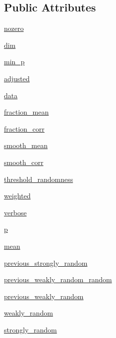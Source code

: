 \subsection*{Public Attributes}
\begin{CompactItemize}
\item 
\hyperlink{classgen_1_1binary_ca500be68fab85fb9606fcb4c5be8f64}{nozero}
\item 
\hyperlink{classgen_1_1binary_37e0504e82a2e1117ed23ff2d8617274}{dim}
\item 
\hyperlink{classgen_1_1binary_ca3be8a3fef7eeebd95bdcd5b5a82a5b}{min\_\-p}
\item 
\hyperlink{classgen_1_1binary_aec6d5ee9de0b2a4ddf0a9fa1ced25ae}{adjusted}
\item 
\hyperlink{classgen_1_1binary_156a3b3004ee18dc4472dbbb22e58441}{data}
\item 
\hyperlink{classgen_1_1binary_d525c9bbdde203e71bfbd20ab8a3b87b}{fraction\_\-mean}
\item 
\hyperlink{classgen_1_1binary_1e3b4573f717d0c9a1c0e04c02f2fd00}{fraction\_\-corr}
\item 
\hyperlink{classgen_1_1binary_37a0b8a17b6838931cc090b0bd420113}{smooth\_\-mean}
\item 
\hyperlink{classgen_1_1binary_6f34a1d5ec2430c38a7d60291e3cf1b5}{smooth\_\-corr}
\item 
\hyperlink{classgen_1_1binary_d6e62d1fa0afe5bd632c632bae0751de}{threshold\_\-randomness}
\item 
\hyperlink{classgen_1_1binary_1249f896120bc73dd69e9cb658847685}{weighted}
\item 
\hyperlink{classgen_1_1binary_273f733629e23ba2e15fad7c1272275d}{verbose}
\item 
\hyperlink{classgen_1_1binary_838502808c65c543b3cb558435047f92}{p}
\item 
\hyperlink{classgen_1_1binary_a14a164be1fc67e5a014782fc29d287b}{mean}
\item 
\hyperlink{classgen_1_1binary_ade0cc2fbad11b31201021a316b6f3a7}{previous\_\-strongly\_\-random}
\item 
\hyperlink{classgen_1_1binary_b84a1de430b3a123d9ccaff9f06d3abc}{previous\_\-weakly\_\-random\_\-random}
\item 
\hyperlink{classgen_1_1binary_8eae76f4e0c1f13ba8ebfed1c5b7fa78}{previous\_\-weakly\_\-random}
\item 
\hyperlink{classgen_1_1binary_a01d31777705f008d6fe5758a4f83106}{weakly\_\-random}
\item 
\hyperlink{classgen_1_1binary_a52bf7827649a6a1389769eecd3872e6}{strongly\_\-random}
\end{CompactItemize}
